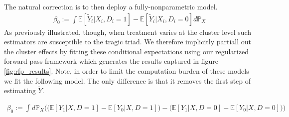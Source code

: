 \documentclass[a4paper,12pt]{article}
\begin{document}
The natural correction is to then deploy a fully-nonparametric model. 
\begin{align*}
\beta_0 := \int \mathbb{E}[\tilde{Y}_i | X_i, D_i=1] - \mathbb{E}[\tilde{Y}_i | X_i, D_i=0] d\mathbb{P}_X
\end{align*}
As previously illustrated, though, when treatment varies at the cluster level such estimators are susceptible to the tragic triad. We therefore implicitly partiall out the cluster effects by fitting these conditional expectations using our regularized forward pass framework which generates the results captured in figure \ref{fig:rfp_results}. Note, in order to limit the computation burden of these models we fit the following model. The only difference is that it removes the first step of estimating $\tilde{Y}$. 

\begin{align*}
    \beta _0 := \int d\mathbb{P}_X\Big(\big(\mathbb{E}[Y_1 |X,D=1] - \mathbb{E}[Y_0 |X,D=1]\big) -  \big(\mathbb{E}[Y_1 |X,D=0] - \mathbb{E}[Y_0 |X,D=0]\big)\Big)
\end{align*}
\end{document}
